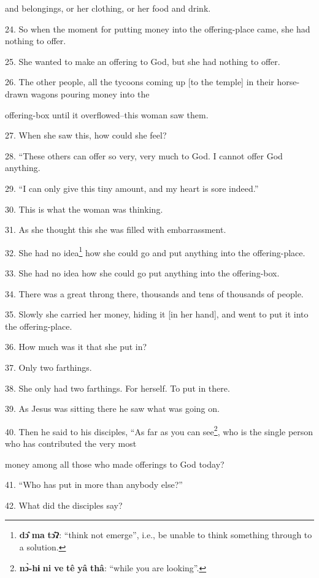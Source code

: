 and belongings, or her clothing, or her food and drink.

24. So when the moment for putting money into the offering-place came, she had nothing
to offer.

25. She wanted to make an offering to God, but she had nothing to offer.

26. The other people, all the tycoons coming up [to the temple] in their horse-drawn
wagons pouring money into the

offering-box until it overflowed--this woman saw them.

27. When she saw this, how could she feel?

28. ``These others can offer so very, very much to God. I cannot offer God
anything.

29. ``I can only give this tiny amount, and my heart is sore indeed.''

30. This is what the woman was thinking.

31. As she thought this she was filled with embarrassment.

32. She had no idea\footnote{\textbf{dɔ̂} \textbf{ma} \textbf{tɔ̂ʔ}: ``think not emerge'', i.e., be unable to think something through to a solution.} how she could go and put anything into the offering-place.

33. She had no idea how she could go put anything into the offering-box.

34. There was a great throng there, thousands and tens of thousands of people.

35. Slowly she carried her money, hiding it [in her hand], and went to put it into
the offering-place.

36. How much was it that she put in?

37. Only two farthings.

38. She only had two farthings. For herself. To put in there.

39. As Jesus was sitting there he saw what was going on.

40. Then he said to his disciples, ``As far as you can see\footnote{\textbf{nɔ̀-hɨ} \textbf{ni} \textbf{ve} \textbf{tê} \textbf{yâ} \textbf{thâ}: ``while you are looking''.}, who is
the single person who has contributed the very most

money among all those who made offerings to God today?

41. ``Who has put in more than anybody else?''

42. What did the disciples say?

